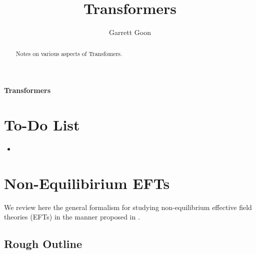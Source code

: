 \documentclass[11pt]{article}
\title{Transformers}
\author{Garrett Goon}
\begin{document}
%

\vspace{1truecm}
%
%
\renewcommand{\thefootnote}{\fnsymbol{footnote}}
\begin{center}
{\huge \bf{Transformers}}
\end{center}


\begin{abstract}

Notes on various aspects of Transfomers.

\end{abstract}

\tableofcontents


\renewcommand*{\thefootnote}{\arabic{footnote}}
\setcounter{footnote}{0}

\section{To-Do List}

\begin{itemize}
\item
\end{itemize}


\section{Non-Equilibirium EFTs\label{sec:NonEqEFTs}}




We review here the general formalism for studying non-equilibrium effective field theories (EFTs) in the manner proposed in \cite{Glorioso:2018wxw}.


\subsection{Rough Outline\label{sec:Outline}}
\end{document}
